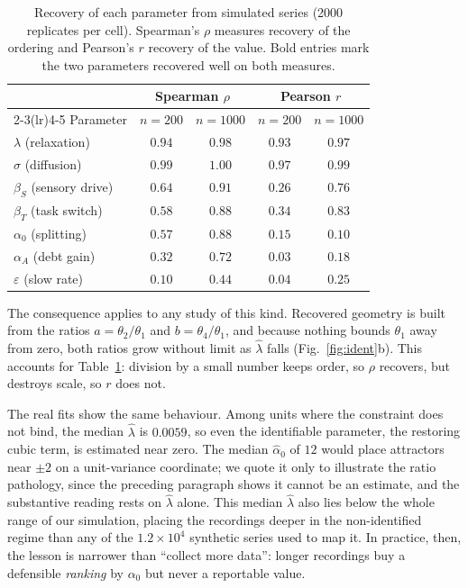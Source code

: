 \documentclass[conference]{IEEEtran}
\begin{document}
\begin{table}[tb]
\caption{Recovery of each parameter from simulated series (2000 replicates
per cell). Spearman's $\rho$ measures recovery of the ordering and Pearson's
$r$ recovery of the value. Bold entries mark the two parameters recovered well
on both measures.}
\label{tab:ident}
\centering
\begin{tabular}{@{}lcccc@{}}
\toprule
& \multicolumn{2}{c}{Spearman $\rho$} & \multicolumn{2}{c}{Pearson $r$} \\
\cmidrule(lr){2-3}\cmidrule(lr){4-5}
Parameter & $n{=}200$ & $n{=}1000$ & $n{=}200$ & $n{=}1000$ \\
\midrule
$\lambda$ (relaxation)      & $\mathbf{0.94}$ & $\mathbf{0.98}$ & $\mathbf{0.93}$ & $\mathbf{0.97}$ \\
$\sigma$ (diffusion)        & $\mathbf{0.99}$ & $\mathbf{1.00}$ & $\mathbf{0.97}$ & $\mathbf{0.99}$ \\
$\beta_S$ (sensory drive)   & $0.64$ & $0.91$ & $0.26$ & $0.76$ \\
$\beta_T$ (task switch)     & $0.58$ & $0.88$ & $0.34$ & $0.83$ \\
$\alpha_0$ (splitting)      & $0.57$ & $0.88$ & $0.15$ & $0.10$ \\
$\alpha_A$ (debt gain)      & $0.32$ & $0.72$ & $0.03$ & $0.18$ \\
$\varepsilon$ (slow rate)   & $0.10$ & $0.44$ & $0.04$ & $0.25$ \\
\bottomrule
\end{tabular}
\end{table}

The consequence applies to any study of this kind. Recovered geometry is built
from the ratios $a=\theta_2/\theta_1$ and $b=\theta_4/\theta_1$, and because
nothing bounds $\theta_1$ away from zero, both ratios grow without limit as
$\hat\lambda$ falls (Fig.~\ref{fig:ident}b). This accounts for
Table~\ref{tab:ident}: division by a small number keeps order, so $\rho$
recovers, but destroys scale, so $r$ does not.

The real fits show the same behaviour. Among units where the constraint does
not bind, the median $\hat\lambda$ is $0.0059$, so even the identifiable
parameter, the restoring cubic term, is estimated near zero. The median
$\hat\alpha_0$ of $12$ would place attractors near $\pm2$ on a unit-variance
coordinate; we quote it only to illustrate the ratio pathology, since the
preceding paragraph shows it cannot be an estimate, and the substantive reading
rests on $\hat\lambda$ alone. This median $\hat\lambda$ also lies below the
whole range of our simulation, placing the recordings deeper in the
non-identified regime than any of the $1.2\times10^{4}$ synthetic series used
to map it. In practice, then, the lesson is narrower than ``collect more
data'': longer recordings buy a defensible \emph{ranking} by $\alpha_0$ but
never a reportable value.
\end{document}
